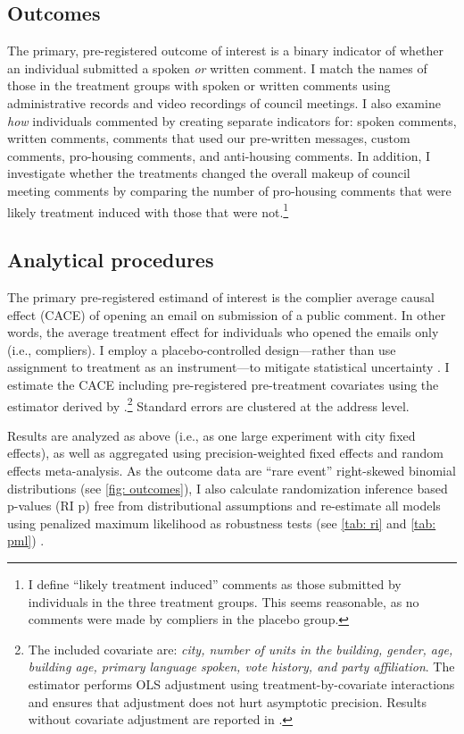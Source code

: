 \documentclass[12pt,final,fleqn]{article}
\theoremstyle{plain}
\begin{document}
\subsection{Outcomes}

The primary, pre-registered outcome of interest is a binary indicator of whether an individual submitted a spoken \textit{or} written comment. I match the names of those in the treatment groups with spoken or written comments using administrative records and video recordings of council meetings. I also examine \textit{how} individuals commented by creating separate indicators for: spoken comments, written comments, comments that used our pre-written messages, custom comments, pro-housing comments, and anti-housing comments.  In addition, I investigate whether the treatments changed the overall makeup of council meeting comments by comparing the number of pro-housing comments that were likely treatment induced with those that were not.\footnote{I define ``likely treatment induced'' comments as those submitted by individuals in the three treatment groups. This seems reasonable, as no comments were made by compliers in the placebo group.}


\subsection{Analytical procedures}\label{sec:analytical procedures}

The primary pre-registered estimand of interest is the complier average causal effect (CACE) of opening an email on submission of a public comment. In other words, the average treatment effect for individuals who opened the emails only (i.e., compliers). I employ a placebo-controlled design---rather than use assignment to treatment as an instrument---to mitigate statistical uncertainty \citep{broockman2017design, nickerson2008voting}. I estimate the CACE including pre-registered pre-treatment covariates using the estimator derived by \citet{lin2013agnostic}.\footnote{The included covariate are: \textit{city, number of units in the building, gender, age, building age, primary language spoken, vote history, and party affiliation}. The \citet{lin2013agnostic} estimator performs OLS adjustment using treatment-by-covariate interactions and ensures that adjustment does not hurt asymptotic precision. Results without covariate adjustment are reported in .} Standard errors are clustered at the address level. 
 
Results are analyzed as above (i.e., as one large experiment with city fixed effects), as well as aggregated using precision-weighted fixed effects and random effects meta-analysis. As the outcome data are ``rare event'' right-skewed binomial distributions (see \autoref{fig: outcomes}), I also calculate randomization inference based p-values (RI p) free from distributional assumptions and re-estimate all models using penalized maximum likelihood as robustness tests (see \autoref{tab: ri} and  \autoref{tab: pml}) \citep{king2001logistic, cook2020fixed}. 
\end{document}
